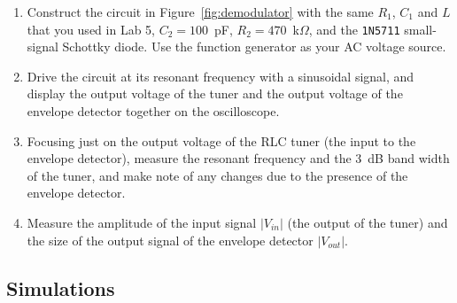 \documentclass[11pt]{article}
\begin{document}
\begin{enumerate}
\item Construct the circuit in Figure~\ref{fig:demodulator} with the
  same $R_1$, $C_1$ and $L$ that you used in Lab 5, $C_2 = 100$~pF,
  $R_2 = 470$~k$\Omega$, and the \texttt{1N5711} small-signal Schottky
  diode. Use the function generator as your AC voltage source.

\item Drive the circuit at its resonant frequency with a sinusoidal
  signal, and display the output voltage of the tuner and the output
  voltage of the envelope detector together on the oscilloscope.
  
\item Focusing just on the output voltage of the RLC tuner (the input
  to the envelope detector), measure the resonant frequency and the
  3~dB band width of the tuner, and make note of any changes due to
  the presence of the envelope detector. 

\item Measure the amplitude of the input signal $|V_{in}|$ (the output
  of the tuner) and the size of the output signal of the envelope
  detector $|V_{out}|$.
\end{enumerate}

\subsection*{Simulations}
\end{document}
